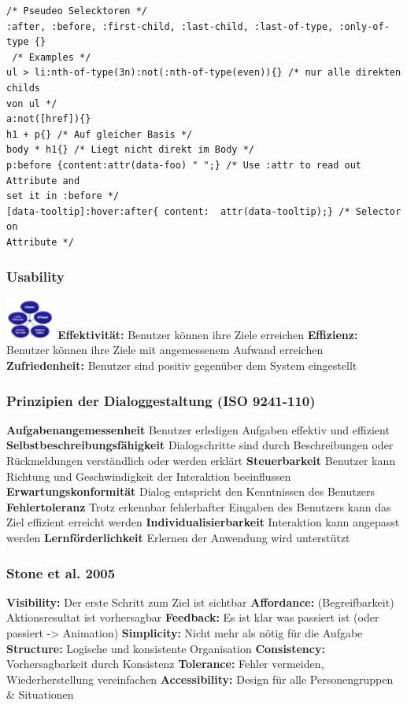 \begin{multicols*}{4}
\begin{verbatim}
/* Pseudeo Selecktoren */
:after, :before, :first-child, :last-child, :last-of-type, :only-of-type {}
 /* Examples */
ul > li:nth-of-type(3n):not(:nth-of-type(even)){} /* nur alle direkten childs 
von ul */
a:not([href]){}
h1 + p{} /* Auf gleicher Basis */
body * h1{} /* Liegt nicht direkt im Body */
p:before {content:attr(data-foo) " ";} /* Use :attr to read out Attribute and 
set it in :before */
[data-tooltip]:hover:after{ content:  attr(data-tooltip);} /* Selector on 
Attribute */
\end{verbatim}

\subsubsection{Usability}
\begin{multicols}{2}
 \includegraphics[width=0.120\textwidth]{images/usability-11}
 \columnbreak
 \textbf{ Effektivität:}
Benutzer können ihre Ziele erreichen
\textbf{ Effizienz: }
Benutzer können ihre Ziele mit angemessenem Aufwand erreichen
\textbf{Zufriedenheit:}
Benutzer sind positiv gegenüber dem System eingestellt
\end{multicols}

\subsubsection{Prinzipien der Dialoggestaltung (ISO 9241-110)}

\textbf{Aufgabenangemessenheit}
Benutzer erledigen Aufgaben effektiv und effizient
\textbf{Selbstbeschreibungsfähigkeit}
Dialogschritte sind durch Beschreibungen oder Rückmeldungen verständlich oder werden erklärt
\textbf{Steuerbarkeit}
Benutzer kann Richtung und Geschwindigkeit der Interaktion beeinflussen
\textbf{Erwartungskonformität}
Dialog entspricht den Kenntnissen des Benutzers
\textbf{Fehlertoleranz}
Trotz erkennbar fehlerhafter Eingaben des Benutzers kann das Ziel effizient erreicht werden
\textbf{Individualisierbarkeit}
Interaktion kann angepasst werden
\textbf{Lernförderlichkeit}
Erlernen der Anwendung wird unterstützt
\subsubsection{Stone et al. 2005}
\textbf{Visibility:} Der erste Schritt zum Ziel ist sichtbar
\textbf{Affordance:} (Begreifbarkeit) Aktionsresultat ist vorhersagbar
\textbf{Feedback:} Es ist klar was passiert ist (oder passiert -> Animation)
\textbf{Simplicity:} Nicht mehr als nötig für die Aufgabe
\textbf{Structure:} Logische und konsistente Organisation
\textbf{Consistency:} Vorhersagbarkeit durch Konsistenz
\textbf{Tolerance:} Fehler vermeiden, Wiederherstellung vereinfachen
\textbf{Accessibility:} Design für alle Personengruppen \& Situationen

\end{multicols*}
